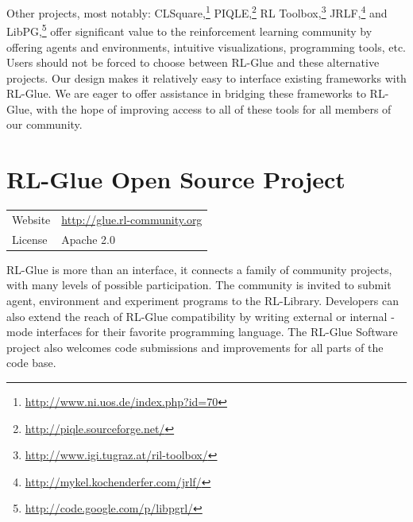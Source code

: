 \documentclass[twoside,11pt]{article}
\begin{document}
Other projects, most notably: CLSquare,\footnote{\url{http://www.ni.uos.de/index.php?id=70}}  PIQLE,\footnote{\url{http://piqle.sourceforge.net/}} RL Toolbox,\footnote{\url{http://www.igi.tugraz.at/ril-toolbox/}
} JRLF,\footnote{\url{http://mykel.kochenderfer.com/jrlf/}}  and LibPG,\footnote{\url{http://code.google.com/p/libpgrl/}} offer significant value to the reinforcement learning community by offering agents and environments, intuitive visualizations, programming tools, etc.  Users should not be forced to choose between RL-Glue and these alternative projects. Our design makes it relatively easy to interface existing frameworks with RL-Glue.  We are eager to offer assistance in bridging these frameworks to RL-Glue, with the hope of improving access to all of these tools for all members of our community.





 
 
 
\section{RL-Glue Open Source Project}
\begin{tabular}{ l l }
  Website &  \url{http://glue.rl-community.org} \\
  License & Apache 2.0  \\
\end{tabular}
\newline
\newline
RL-Glue is more than an interface, it connects a family of community projects, with many levels of possible participation. The community is invited to submit agent, environment and experiment programs to the RL-Library. Developers can also extend the reach of RL-Glue compatibility by writing external or internal -mode interfaces for their favorite programming language.  The RL-Glue Software project also welcomes code submissions and improvements for all parts of the code base.  


\end{document}
